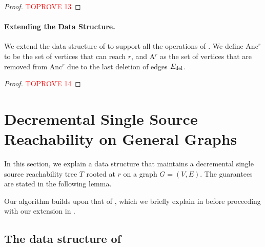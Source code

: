 \documentclass[11pt]{article}
\newcommand{\anc}[1]{\textrm{{\normalfont Anc}\( ^{ #1 }\)}\xspace}
\newcommand{\A}[1]{\textrm{{\normalfont A}\( ^{ #1 } \)}\xspace}
\newcommand{\T}[1]{\textrm{\normalfont \( T^{} \)}\xspace}
\begin{document}
\begin{proof}\textcolor{red}{TOPROVE 13}\end{proof}









\paragraph*{Extending the Data Structure.}
We extend the data structure of  to support all the operations of .
We define \anc{r} to be the set of vertices that can reach \( r \), and \A{r} as the set of vertices that are removed from \anc{r} due to the last deletion of edges \( \Ed \).


\begin{proof}\textcolor{red}{TOPROVE 14}\end{proof}






















 

\section{Decremental Single Source Reachability on General Graphs} \label{app:general}



In this section, we explain a data structure that
maintains a decremental single source reachability tree \T{r} rooted at \( r \) on a graph \( G = (V, E) \).
The guarantees are stated in the following lemma.

\roditty*




Our algorithm builds upon that of \citeauthor{Roditty:2016aa}, which we briefly explain in  
before proceeding with our extension in .



\subsection{The data structure of \cite{Roditty:2016aa}} \label{subsec:ds_RZ}
\end{document}
